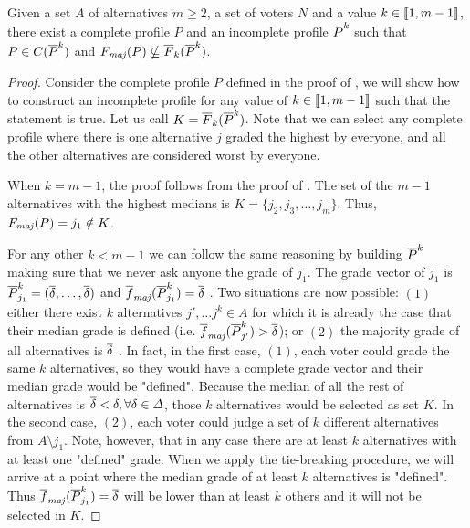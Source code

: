 	\begin{theorem}
		\label{th:uncompleteK}
		Given a set $A$ of alternatives $m\geq 2$, a set of voters $N$ and a value $k\in \llbracket1,m-1\rrbracket$, there exist a complete profile $P$ and an incomplete profile $\overline{P}^k$ such that $P \in C(\overline{P}^k)$ and $\Fmaj(P) \nsubseteq \overline{F}_k(\Pbar^k)$.
	\end{theorem}
	\begin{proof}
		Consider the complete profile $P$ defined in the proof of , we will show how to construct an incomplete profile for any value of $k\in \llbracket1,m-1\rrbracket$ such that the statement is true. Let us call $K=\overline{F}_k(\overline{P}^k)$.
		Note that we can select any complete profile where there is one alternative $j$ graded the highest by everyone, and all the other alternatives are considered worst by everyone.
		
		When $k=m-1$, the proof follows from the proof of . The set of the $m-1$ alternatives with the highest medians is $K=\{j_2,j_3,\dots,j_m\}$. Thus, $\Fmaj(P)=j_1 \notin K$.
		
		For any other $k<m-1$ we can follow the same reasoning by building $\overline{P}^k$ making sure that we never ask anyone the grade of $j_1$. 
		The grade vector of $j_1$ is $\overline{P}^k_{j_1}=(\overline{\delta}, \dots, \overline{\delta})$ and $\fmajbar(\Pbar^k_{j_1})=\dbar$ .
		Two situations are now possible: $(1)$ either there exist $k$ alternatives $j',\dots j^k\in A$  for which it is already the case that their median grade is defined (i.e. $\fmajbar(\Pbar^k_{j'})>\dbar$); or $(2)$ the majority grade of all alternatives is $\overline{\delta}$ . 
		In fact, in the first case, $(1)$, each voter could grade the same $k$ alternatives, so they would have a complete grade vector and their median grade would be "defined". Because the median of all the rest of alternatives is $\overline{\delta} < \delta, \forall \delta \in \Delta$, those $k$ alternatives would be selected as set $K$.
		In the second case, $(2)$, each voter could judge a set of $k$ different alternatives from $A\setminus j_1$. Note, however, that in any case there are at least $k$ alternatives with at least one "defined" grade. When we apply the tie-breaking procedure, we will arrive at a point where the median grade of at least $k$ alternatives is "defined". Thus $\fmajbar(\Pbar^k_{j_1})=\dbar$ will be lower than at least $k$ others and it will not be selected in $K$.
	\end{proof}	
	
